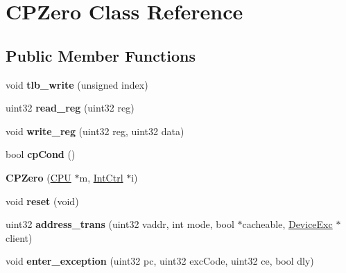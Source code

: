 \hypertarget{classCPZero}{
\section{CPZero Class Reference}
\label{classCPZero}
}
\subsection*{Public Member Functions}
\begin{DoxyCompactItemize}
\item 
\hypertarget{classCPZero_a703d4b95b23ecfc4039ec1001b706e0c}{
void {\bfseries tlb\_\-write} (unsigned index)}
\label{classCPZero_a703d4b95b23ecfc4039ec1001b706e0c}

\item 
\hypertarget{classCPZero_a3bcb604871913be1e6ab8fa917f794fe}{
uint32 {\bfseries read\_\-reg} (uint32 reg)}
\label{classCPZero_a3bcb604871913be1e6ab8fa917f794fe}

\item 
\hypertarget{classCPZero_ae9a4cd90b9983d4958862df5a9e944c8}{
void {\bfseries write\_\-reg} (uint32 reg, uint32 data)}
\label{classCPZero_ae9a4cd90b9983d4958862df5a9e944c8}

\item 
\hypertarget{classCPZero_a105d64ef00d18f173425ca16172f140b}{
bool {\bfseries cpCond} ()}
\label{classCPZero_a105d64ef00d18f173425ca16172f140b}

\item 
\hypertarget{classCPZero_a1c0dc92c666aaa4b420990693aad289f}{
{\bfseries CPZero} (\hyperlink{classCPU}{CPU} $\ast$m, \hyperlink{classIntCtrl}{IntCtrl} $\ast$i)}
\label{classCPZero_a1c0dc92c666aaa4b420990693aad289f}

\item 
\hypertarget{classCPZero_a53c439f8991ed00861eea4bdf567d719}{
void {\bfseries reset} (void)}
\label{classCPZero_a53c439f8991ed00861eea4bdf567d719}

\item 
\hypertarget{classCPZero_a68d1b7345c9504dd6c3558167bf2f7fd}{
uint32 {\bfseries address\_\-trans} (uint32 vaddr, int mode, bool $\ast$cacheable, \hyperlink{classDeviceExc}{DeviceExc} $\ast$client)}
\label{classCPZero_a68d1b7345c9504dd6c3558167bf2f7fd}

\item 
\hypertarget{classCPZero_a578fcf97eaf38f17b7fbaf39ccb8c517}{
void {\bfseries enter\_\-exception} (uint32 pc, uint32 excCode, uint32 ce, bool dly)}
\label{classCPZero_a578fcf97eaf38f17b7fbaf39ccb8c517}


\end{DoxyCompactItemize}
